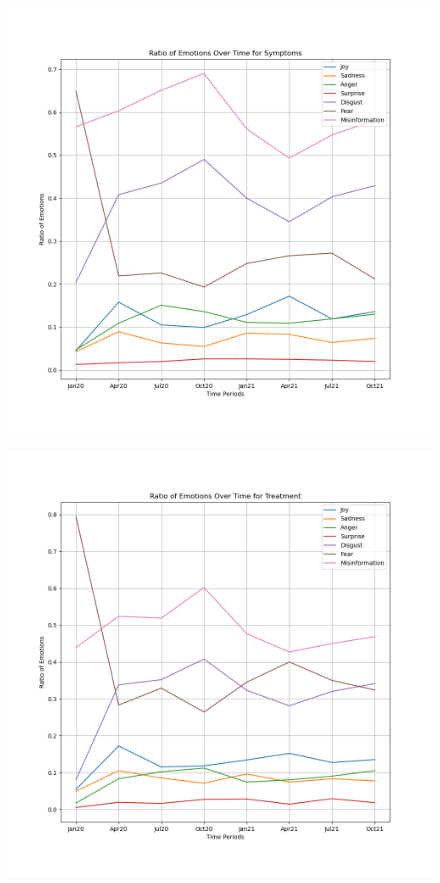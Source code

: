 \documentclass{l4proj}
\begin{document}
\begin{appendices}
\begin{figure}[H]
\begin{minipage}[c]{0.49\linewidth}
\centering
\includegraphics[width=\textwidth]{images/SymptomsEmotion.png}
\label{fig:sympemo}
\end{minipage}\hfill
\begin{minipage}[c]{0.49\linewidth}
\centering
\includegraphics[width=\textwidth]{images/TreatmentEmotion.png}
\label{fig:treatemo}
\end{minipage}
\end{figure}


\end{appendices}
\end{document}
